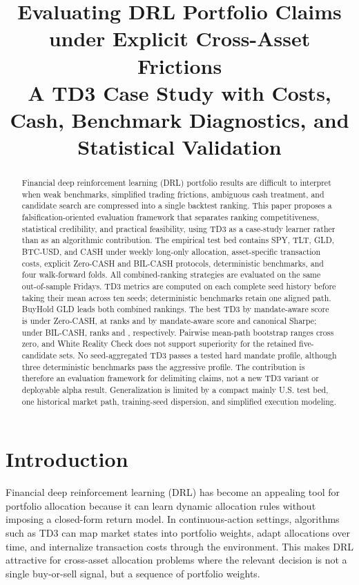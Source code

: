\documentclass[11pt]{article}
\title{\textbf{Evaluating DRL Portfolio Claims under Explicit Cross-Asset Frictions}\\
\large A TD3 Case Study with Costs, Cash, Benchmark Diagnostics, and Statistical Validation}
\author{}
\date{}
\newcommand{\cashzero}{Zero-CASH}
\newcommand{\cashbil}{BIL-CASH}
\begin{document}
\maketitle

\begin{abstract}
Financial deep reinforcement learning (DRL) portfolio results are difficult to interpret when weak benchmarks, simplified trading frictions, ambiguous cash treatment, and candidate search are compressed into a single backtest ranking. This paper proposes a falsification-oriented evaluation framework that separates ranking competitiveness, statistical credibility, and practical feasibility, using TD3 as a case-study learner rather than as an algorithmic contribution. The empirical test bed contains SPY, TLT, GLD, BTC-USD, and CASH under weekly long-only allocation, asset-specific transaction costs, explicit \cashzero{} and \cashbil{} protocols, deterministic benchmarks, and four walk-forward folds. All combined-ranking strategies are evaluated on the same \AlignedWeeks{} out-of-sample Fridays. TD3 metrics are computed on each complete seed history before taking their mean across ten seeds; deterministic benchmarks retain one aligned path. BuyHold GLD leads both combined rankings. The best TD3 by mandate-aware score is \ZeroBestTDThreeLabel{} under \cashzero{}, at ranks \ZeroBestTDThreeMandateRank{} and \ZeroBestTDThreeSharpeRank{} by mandate-aware score and canonical Sharpe; under \cashbil{}, \BilBestTDThreeLabel{} ranks \BilBestTDThreeMandateRank{} and \BilBestTDThreeSharpeRank{}, respectively. Pairwise mean-path bootstrap ranges cross zero, and White Reality Check does not support superiority for the retained five-candidate sets. No seed-aggregated TD3 passes a tested hard mandate profile, although three deterministic benchmarks pass the aggressive profile. The contribution is therefore an evaluation framework for delimiting claims, not a new TD3 variant or deployable alpha result. Generalization is limited by a compact mainly U.S. test bed, one historical market path, training-seed dispersion, and simplified execution modeling.
\end{abstract}

\section{Introduction}

Financial deep reinforcement learning (DRL) has become an appealing tool for portfolio allocation because it can learn dynamic allocation rules without imposing a closed-form return model. In continuous-action settings, algorithms such as TD3 can map market states into portfolio weights, adapt allocations over time, and internalize transaction costs through the environment. This makes DRL attractive for cross-asset allocation problems where the relevant decision is not a single buy-or-sell signal, but a sequence of portfolio weights.
\end{document}
